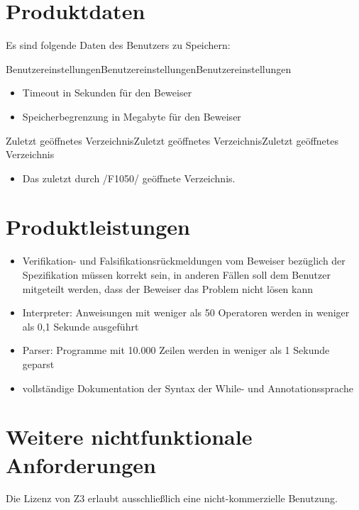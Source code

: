 \documentclass[a4paper,10pt]{article}
\begin{document}
\section{Produktdaten}
Es sind folgende Daten des Benutzers zu Speichern:\\
\begin{PD}{Benutzereinstellungen}{Benutzereinstellungen}{Benutzereinstellungen}
\begin{itemize}
  \item Timeout in Sekunden f\"{u}r den Beweiser
  \item Speicherbegrenzung in Megabyte f\"{u}r den Beweiser
\end{itemize}
\end{PD}
\begin{PD}{Zuletzt ge\"{o}ffnetes Verzeichnis}{Zuletzt ge\"{o}ffnetes Verzeichnis}{Zuletzt ge\"{o}ffnetes Verzeichnis}
\begin{itemize}
  \item Das zuletzt durch /F1050/ ge\"{o}ffnete Verzeichnis.
\end{itemize}
\end{PD}


\section{Produktleistungen}
\begin{itemize}
  \item Verifikation- und Falsifikationsr\"{u}ckmeldungen vom Beweiser bez\"{u}glich der Spezifikation m\"{u}ssen korrekt sein, in anderen F\"{a}llen soll dem Benutzer mitgeteilt werden, dass der Beweiser das Problem nicht l\"{o}sen kann
  \item Interpreter: Anweisungen mit weniger als 50 Operatoren werden in weniger als 0,1 Sekunde ausgef\"{u}hrt
  \item Parser: Programme mit 10.000 Zeilen werden in weniger als 1 Sekunde geparst
  \item vollst\"{a}ndige Dokumentation der Syntax der While- und Annotationssprache
\end{itemize}

\section{Weitere nichtfunktionale Anforderungen}
Die Lizenz von Z3 erlaubt ausschlie\ss{}lich eine nicht-kommerzielle Benutzung.
\end{document}

